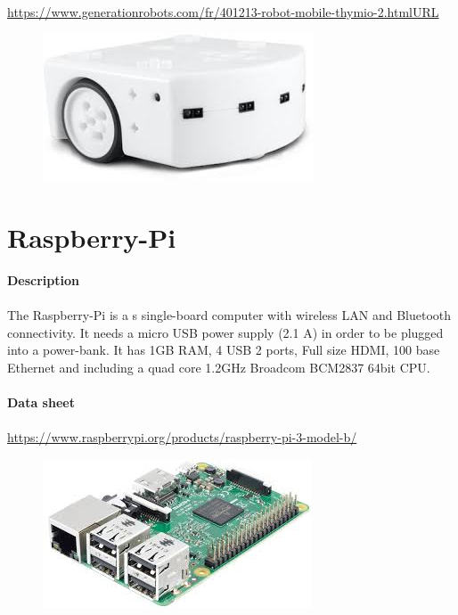 \documentclass[12pt]{report}
\begin{document}
	\paragraph{}
	\url{https://www.generationrobots.com/fr/401213-robot-mobile-thymio-2.htmlURL}
	\begin{figure}[H]
		\begin{center}
			\includegraphics[scale=0.6]{res/thymio.jpg}
		\end{center}
	\end{figure}
	\section{Raspberry-Pi}
	\textbf{Description}
	\paragraph{}
	The Raspberry-Pi is a s single-board computer with wireless LAN and Bluetooth connectivity. It needs a micro USB power supply (2.1 A) in order to be plugged into a power-bank. It has 1GB RAM, 4 USB 2 ports, Full size HDMI, 100 base Ethernet and including a quad core 1.2GHz Broadcom BCM2837 64bit CPU.\\ \\
	\textbf{Data sheet} 
	\paragraph{}
	\url{https://www.raspberrypi.org/products/raspberry-pi-3-model-b/}
	\begin{figure}[H]
		\begin{center}
			\includegraphics[scale=0.6]{res/raspberry.jpg}
		\end{center}
	\end{figure}
\end{document}

